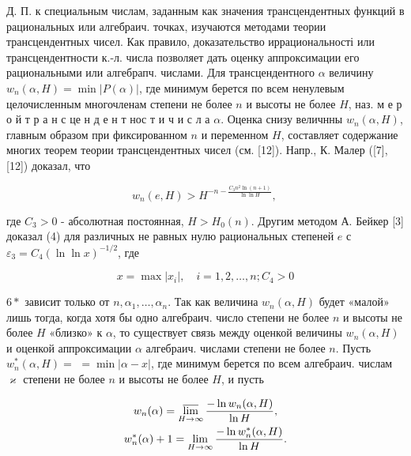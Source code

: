 \documentclass[10pt]{article}
\begin{document}
Д. П. к специальным числам, заданным как значения трансцендентных функций в рациональных или алгебраич. точках, изучаются методами теории трансцендентных чисел. Как правило, доказательство иррациональності или трансцендентности к.-л. числа позволяет дать оценку аппроксимации его рациональными или алгебрапч. числами. Для трансцендентного $\alpha$ величину $w_{n}(\alpha, H)=\min |P(\alpha)|$, где минимум берется по всем ненулевым целочисленным многочленам степени не более $n$ и высоты не более $H$, наз. м е р о й т р а н с це н д е н т нос т и ч и с л а $\alpha$. Оценка снизу величнны $w_{n}(\alpha, H)$, главным образом при фиксированном $n$ и переменном $H$, составляет содержание многих теорем теории трансцендентных чисел (см. [12]). Напр., К. Малер ([7], [12]) доказал, что



\[

w_{n}(e, H)>H^{-n-\frac{C_{3} n^{2} \ln (n+1)}{\ln \ln H}} \text {, }

\]



где $C_{3}>0$ - абсолютная постоянная, $H>H_{0}(n)$. Другим методом А. Бейкер [3] доказал (4) для различных не равных нулю рациональных степеней $e$ с $\varepsilon_{3}=C_{4}(\ln \ln x)^{-1 / 2}$, где



\[

x=\max \left|x_{i}\right|, \quad i=1,2, \ldots, n ; C_{4}>0

\]



$6 *$ зависит только от $n, \alpha_{1}, \ldots, \alpha_{n}$. Так как величина $w_{n}(\alpha, H)$ будет «малой» лишь тогда, когда хотя бы одно алгебраич. число степени не более $n$ и высоты не более $H$ «близко» к $\alpha$, то существует связь между оценкой величины $w_{n}(\alpha, H)$ и оценкой аппроксимации $\alpha$ алгебраич. числами степени не более $n$. Пусть $w_{n}^{*}(\alpha, H)=$ $=\min |\alpha-x|$, где минимум берется по всем алгебраич. числам $\varkappa$ степени не более $n$ и высоты не более $H$, и пусть



\[

\begin{gathered}

w_{n}(\alpha)=\varlimsup_{H \rightarrow \infty} \frac{-\ln w_{n}(\alpha, H)}{\ln H}, \\

w_{n}^{*}(\alpha)+1=\lim _{H \rightarrow \infty} \frac{-\ln w_{n}^{*}(\alpha, H)}{\ln H} .

\end{gathered}

\]
\end{document}
